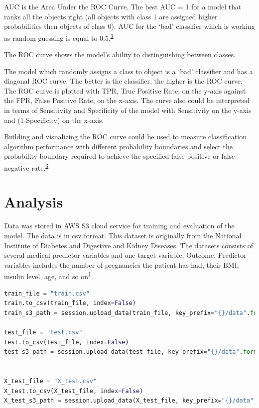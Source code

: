 \documentclass[
]{article}
\begin{document}
AUC is the Area Under the ROC Curve. The best AUC = 1 for a model that
ranks all the objects right (all objects with class 1 are assigned
higher probabilities then objects of class 0). AUC for the `bad'
classifier which is working as random guessing is equal to
0.5.\textsuperscript{\protect\hyperlink{ref-volo}{3}}

The ROC curve shows the model's ability to distinguishing between
classes.

The model which randomly assigns a class to object is a `bad' classifier
and has a diagonal ROC curve. The better is the classifier, the higher
is the ROC curve. The ROC curve is plotted with TPR, True Positive Rate,
on the y-axis against the FPR, False Positive Rate, on the x-axis. The
curve also could be interpreted in terms of Sensitivity and Specificity
of the model with Sensitivity on the y-axis and (1-Specificity) on the
x-axis.

Building and visualizing the ROC curve could be used to measure
classification algorithm performance with different probability
boundaries and select the probability boundary required to achieve the
specified false-positive or false-negative
rate.\textsuperscript{\protect\hyperlink{ref-volo}{3}}

\hypertarget{analysis}{%
\section{Analysis}\label{analysis}}

Data was stored in AWS S3 cloud service for training and evaluation of
the model. The data is in csv format. This dataset is originally from
the National Institute of Diabetes and Digestive and Kidney Diseases.
The datasets consists of several medical predictor variables and one
target variable, Outcome. Predictor variables includes the number of
pregnancies the patient has had, their BMI, insulin level, age, and so
on\textsuperscript{\protect\hyperlink{ref-ehr}{1}}.

\begin{lstlisting}[language=python]
train_file = "train.csv"
train.to_csv(train_file, index=False)
train_s3_path = session.upload_data(train_file, key_prefix="{}/data".format(prefix))

test_file = "test.csv"
test.to_csv(test_file, index=False)
test_s3_path = session.upload_data(test_file, key_prefix="{}/data".format(prefix))


X_test_file = "X_test.csv"
X_test.to_csv(X_test_file, index=False)
X_test_s3_path = session.upload_data(X_test_file, key_prefix="{}/data".format(prefix))
\end{lstlisting}
\end{document}
